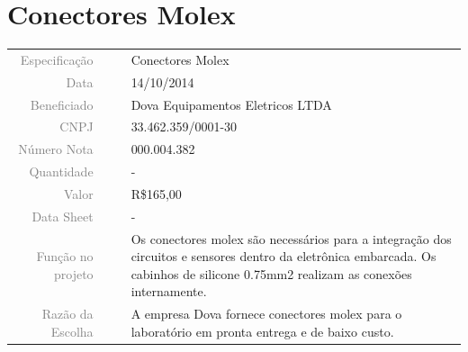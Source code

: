 

\section{Conectores Molex}
\label{conectores_01}


\begin{table}[ht!]

	\begin{tabular}{r l|l p{12cm} }
		
		\textcolor{gray}{Especificação} &&& 	{Conectores Molex}\\
		\textcolor{gray}{Data} &&& 				{14/10/2014}\\
        \textcolor{gray}{Beneficiado} &&&		{Dova Equipamentos Eletricos LTDA}
        \\
        \textcolor{gray}{CNPJ} &&& 				{33.462.359/0001-30} \\
        \textcolor{gray}{Número Nota} &&& 		{000.004.382} \\
		\textcolor{gray}{Quantidade} &&& 		{-} \\
		\textcolor{gray}{Valor} &&& 			{R\$165,00} \\
		\textcolor{gray}{Data Sheet} &&& 		{-} \\

		\textcolor{gray}{Função no projeto} &&& {Os conectores molex são necessários
		para a integração dos circuitos e sensores dentro da eletrônica embarcada. Os
		cabinhos de silicone 0.75mm2 realizam as conexões internamente.}
		\\
		\textcolor{gray}{Razão da Escolha} &&& {A empresa Dova fornece conectores
		molex para o laboratório em pronta entrega e de baixo custo.}

	\end{tabular}
\end{table}

\newpage
